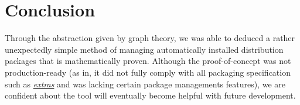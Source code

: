 \documentclass[a4paper,12pt]{article}
\begin{document}
\section{Conclusion}
Through the abstraction given by graph theory, we was able to deduced
a rather unexpectedly simple method of managing automatically installed
distribution packages that is mathematically proven.
Although the proof-of-concept was not production-ready (as in,
it did not fully comply with all packaging specification such as
\href{https://www.python.org/dev/peps/pep-0508/#extras}{\emph{extras}}
and was lacking certain package managements features), we are confident
about the tool will eventually become helpful with future development.
\end{document}
